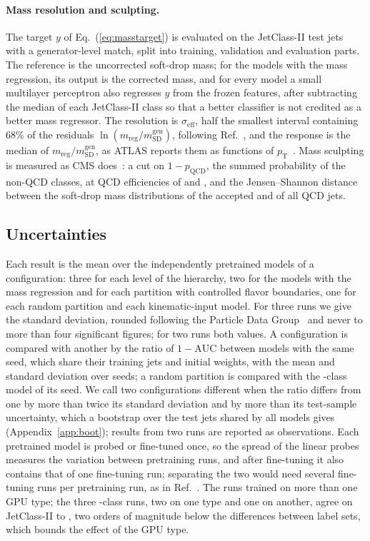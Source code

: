 \documentclass[11pt]{article}
\newcommand{\Kfull}{\VocabSizeLoneeighteight}
\newcommand{\oma}{\ensuremath{1-\mathrm{AUC}}}
\begin{document}
\paragraph{Mass resolution and sculpting.} The target $y$ of Eq.~(\ref{eq:masstarget}) is evaluated
on the JetClass-II test jets with a generator-level match, split into training, validation and
evaluation parts. The reference is the uncorrected soft-drop mass; for the models with the mass
regression, its output is the corrected mass, and for every model a small multilayer perceptron also
regresses $y$ from the frozen features, after subtracting the median of each JetClass-II class so
that a better classifier is not credited as a better mass regressor. The resolution is
$\sigma_{\mathrm{eff}}$, half the smallest interval containing 68\% of the residuals
$\ln(m_{\mathrm{reg}}/m_{\mathrm{SD}}^{\mathrm{gen}})$, following Ref.~\cite[Sec.~8.2.2]{glopart},
and the response is the median of $m_{\mathrm{reg}}/m_{\mathrm{SD}}^{\mathrm{gen}}$, as ATLAS reports
them as functions of $p_{\mathrm T}$~\cite[Sec.~6]{atlasregression}. Mass sculpting is measured as
CMS does~\cite{cmspart}: a cut on $1 - p_{\mathrm{QCD}}$, the summed probability of the non-QCD
classes, at QCD efficiencies of \SculptEffHigh{} and \SculptEffLow, and the Jensen--Shannon distance
between the soft-drop mass distributions of the accepted and of all QCD jets.

\subsection{Uncertainties}\label{sec:stats}

Each result is the mean over the independently pretrained models of a configuration: three for
each level of the hierarchy, two for the models with the mass regression and for each partition
with controlled flavor boundaries, one for each random partition and each kinematic-input model.
For three runs we give the standard deviation, rounded following the Particle Data Group~\cite{pdg}
and never to more than four significant figures; for two runs both values. A configuration is
compared with another by the ratio of $\oma$ between models with the same seed, which share their
training jets and initial weights, with the mean and standard deviation over seeds; a random
partition is compared with the \Kfull-class model of its seed. We call two configurations different
when the ratio differs from one by more than twice its standard deviation and by more than its
test-sample uncertainty, which a bootstrap over the test jets shared by all models gives
(Appendix~\ref{app:boot}); results from two runs are reported as observations. Each pretrained
model is probed or fine-tuned once, so the spread of the linear probes measures the variation
between pretraining runs, and after fine-tuning it also contains that of one fine-tuning run;
separating the two would need several fine-tuning runs per pretraining run, as in
Ref.~\cite[App.~D]{multiberts}. The runs trained on more than one GPU type; the three
\Kfull-class runs, two on one type and one on another, agree on JetClass-II to \MlstGpuTypeBound,
two orders of magnitude below the differences between label sets, which bounds the effect of the GPU
type.
\end{document}
